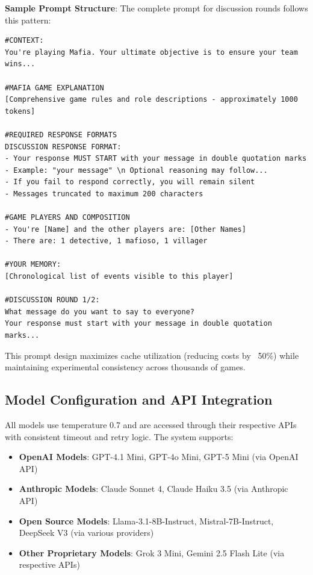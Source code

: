 \documentclass{article}
\begin{document}
\textbf{Sample Prompt Structure}: The complete prompt for discussion rounds follows this pattern:

\begin{small}
\begin{verbatim}
#CONTEXT:
You're playing Mafia. Your ultimate objective is to ensure your team wins...

#MAFIA GAME EXPLANATION
[Comprehensive game rules and role descriptions - approximately 1000 tokens]

#REQUIRED RESPONSE FORMATS
DISCUSSION RESPONSE FORMAT:
- Your response MUST START with your message in double quotation marks
- Example: "your message" \n Optional reasoning may follow...
- If you fail to respond correctly, you will remain silent
- Messages truncated to maximum 200 characters

#GAME PLAYERS AND COMPOSITION
- You're [Name] and the other players are: [Other Names]
- There are: 1 detective, 1 mafioso, 1 villager

#YOUR MEMORY:
[Chronological list of events visible to this player]

#DISCUSSION ROUND 1/2:
What message do you want to say to everyone?
Your response must start with your message in double quotation marks...
\end{verbatim}
\end{small}

This prompt design maximizes cache utilization (reducing costs by ~50\%) while maintaining experimental consistency across thousands of games.

\subsection{Model Configuration and API Integration}

All models use temperature 0.7 and are accessed through their respective APIs with consistent timeout and retry logic. The system supports:

\begin{itemize}
    \item \textbf{OpenAI Models}: GPT-4.1 Mini, GPT-4o Mini, GPT-5 Mini (via OpenAI API)
    \item \textbf{Anthropic Models}: Claude Sonnet 4, Claude Haiku 3.5 (via Anthropic API)
    \item \textbf{Open Source Models}: Llama-3.1-8B-Instruct, Mistral-7B-Instruct, DeepSeek V3 (via various providers)
    \item \textbf{Other Proprietary Models}: Grok 3 Mini, Gemini 2.5 Flash Lite (via respective APIs)
\end{itemize}
\end{document}
